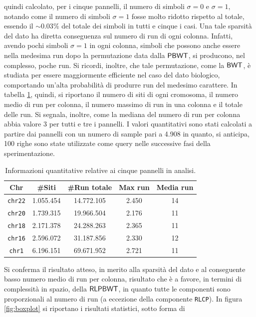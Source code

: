 quindi calcolato, per i cinque pannelli, il numero di simboli $\sigma=0$ e
$\sigma=1$, notando come il numero di simboli $\sigma=1$ fosse molto ridotto
rispetto al totale, essendo il $\sim 0.03\%$ del totale dei simboli in tutti e
cinque i casi. Una tale
sparsità del dato ha diretta conseguenza sul numero di run di ogni
colonna. Infatti, avendo 
pochi simboli $\sigma=1$ in ogni colonna, simboli che possono anche
essere nella medesima run dopo la permutazione data dalla
$\mbox{\rm {\sf PBWT}}$, si producono, nel complesso, poche run. Si ricordi, inoltre, che tale
permutazione, come la 
$\mbox{\rm {\sf BWT}}$, è studiata per essere 
maggiormente efficiente nel caso del dato biologico, comportando un'alta
probabilità di produrre run del medesimo carattere. In tabella \ref{tab:panel},
quindi, si riportano il numero di siti di ogni cromosoma, il 
numero medio di run per colonna, il numero 
massimo di run in una colonna e il totale delle run. Si segnala, inoltre,
come la
mediana del numero di run per colonna abbia valore 3 per tutti e tre i pannelli.
I valori quantitativi sono 
stati calcolati a partire dai pannelli con un numero di sample pari a 4.908 in
quanto, si anticipa, 100 righe sono state utilizzate come query nelle successive
fasi della sperimentazione.
\begin{table}
  \centering
  \caption{Informazioni quantitative relative ai cinque pannelli in analisi.}
  \label{tab:panel}
  \begin{tabular}{c||c|c|c|c}
    \textbf{Chr} & \textbf{\#Siti} & \textbf{\#Run totale}
    & \textbf{Max run} & \textbf{Media run} \\ 
    \hline
    \texttt{chr22} & 1.055.454 & 14.772.105 & 2.450 & 14\\
    \texttt{chr20} & 1.739.315 & 19.966.504 & 2.176 & 11\\
    \texttt{chr18} & 2.171.378 & 24.288.263 & 2.365 & 11\\
    \texttt{chr16} & 2.596.072 & 31.187.856 & 2.330 & 12\\
    \texttt{chr1} & 6.196.151 & 69.671.952 & 2.721 & 11\\
  \end{tabular}
\end{table}
Si conferma il risultato atteso, in merito alla sparsità del dato e al
conseguente basso numero medio di run per colonna, risultato che è a favore, in
termini di 
complessità in spazio, della $\mbox{\rm {\sf RLPBWT}}$, in quanto tutte le componenti sono
proporzionali al numero di run (a eccezione della componente \texttt{RLCP}). In
figura 
\ref{fig:boxplot} si riportano i risultati statistici, sotto forma di
